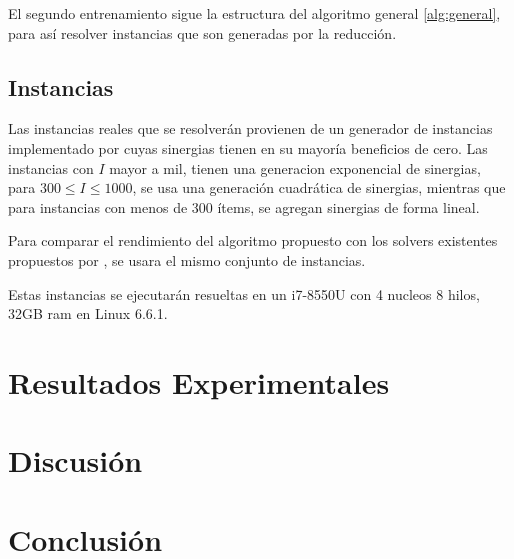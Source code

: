 \documentclass[spanish, a4paper, 12pt, twoside, openany,final]{book}
\numberwithin{equation}{section}
\begin{document}
El segundo entrenamiento sigue la estructura del algoritmo general \ref{alg:general}, para así resolver instancias que son generadas por la reducción.




\section{Instancias}

Las instancias reales que se resolverán provienen de un generador de instancias implementado por \cite{baldo_polynomial_2023} cuyas sinergias tienen en su mayoría beneficios de cero. Las instancias con $I$ mayor a mil, tienen una generacion exponencial de sinergias, para $300 \le I \le 1000$, se usa una generación cuadrática de sinergias, mientras que para instancias con menos de 300 ítems, se agregan sinergias de forma lineal.

Para comparar el rendimiento del algoritmo propuesto con los solvers existentes propuestos por \cite{baldo_polynomial_2023}, se usara el mismo conjunto de instancias.

Estas instancias se ejecutarán resueltas en un i7-8550U con 4 nucleos 8 hilos, 32GB ram en Linux 6.6.1.

 
\clearpage

\chapter{Resultados Experimentales}






\chapter{Discusión}
    
\clearpage


\chapter{Conclusión}
    
\clearpage

\newpage
\renewcommand\refname{Referencias}          %
{                           %
}
\end{document}
